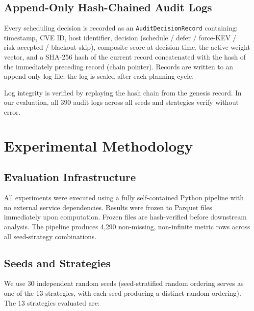 \documentclass[journal]{IEEEtran}
\begin{document}
\subsection{Append-Only Hash-Chained Audit Logs}

Every scheduling decision is recorded as an \texttt{AuditDecisionRecord}
containing: timestamp, CVE ID, host identifier, decision
(schedule / defer / force-KEV / risk-accepted / blackout-skip),
composite score at decision time, the active weight vector, and
a SHA-256 hash of the current record concatenated with the hash
of the immediately preceding record (chain pointer).  Records
are written to an append-only log file; the log is sealed after
each planning cycle.

Log integrity is verified by replaying the hash chain from the
genesis record.  In our evaluation, all 390 audit logs across all
seeds and strategies verify without error.

\section{Experimental Methodology}
\label{sec:methodology}

\subsection{Evaluation Infrastructure}

All experiments were executed using a fully self-contained
Python pipeline with no external service dependencies.  Results
were frozen to Parquet files immediately upon computation.
Frozen files are hash-verified before downstream analysis.  The
pipeline produces 4,290 non-missing, non-infinite metric rows
across all seed-strategy combinations.

\subsection{Seeds and Strategies}

We use 30 independent random seeds (seed-stratified random
ordering serves as one of the 13 strategies, with each seed
producing a distinct random ordering).  The 13 strategies
evaluated are:
\end{document}
